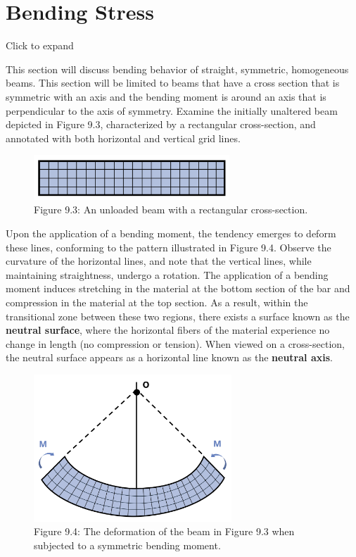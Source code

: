 \documentclass[
  letterpaper,
  DIV=11,
  numbers=noendperiod]{scrreprt}
\begin{document}
\section{Bending Stress}\label{sec-9.1}

Click to expand

This section will discuss bending behavior of straight, symmetric,
homogeneous beams. This section will be limited to beams that have a
cross section that is symmetric with an axis and the bending moment is
around an axis that is perpendicular to the axis of symmetry. Examine
the initially unaltered beam depicted in Figure 9.3, characterized by a
rectangular cross-section, and annotated with both horizontal and
vertical grid lines.

\begin{figure}[H]

{\centering \includegraphics[width=2.89583in,height=\textheight]{images/CH9 PNGs/Figure 9.3.png}

}

\caption{Figure 9.3: An unloaded beam with a rectangular cross-section.}

\end{figure}%

Upon the application of a bending moment, the tendency emerges to deform
these lines, conforming to the pattern illustrated in Figure 9.4.
Observe the curvature of the horizontal lines, and note that the
vertical lines, while maintaining straightness, undergo a rotation. The
application of a bending moment induces stretching in the material at
the bottom section of the bar and compression in the material at the top
section. As a result, within the transitional zone between these two
regions, there exists a surface known as the \textbf{neutral surface},
where the horizontal fibers of the material experience no change in
length (no compression or tension). When viewed on a cross-section, the
neutral surface appears as a horizontal line known as the
\textbf{neutral axis}.

\begin{figure}[H]

{\centering \includegraphics[width=2.92708in,height=\textheight]{images/CH9 PNGs/Figure 9.4.png}

}

\caption{Figure 9.4: The deformation of the beam in Figure 9.3 when
subjected to a symmetric bending moment.}

\end{figure}%
\end{document}
